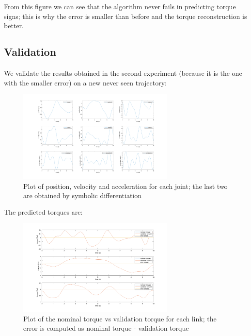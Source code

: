 \documentclass{article}
\begin{document}
From this figure we can see that the algorithm never fails in predicting torque signs; this is why the error is smaller than before and the torque reconstruction is better.

\subsection{Validation} \paragraph{} We validate the results obtained in the second experiment (because it is the one with the smaller error) on a new never seen trajectory:

\begin{figure}[!htbp]
\centering
\includegraphics[width=0.7\textwidth]{images/3-dof/validation_trajectory.png}
\caption{Plot of position, velocity and acceleration for each joint; the last two are obtained by symbolic differentiation}
\end{figure}
\FloatBarrier

The predicted torques are:

\begin{figure}[!htbp]
\centering
\includegraphics[width=0.7\textwidth]{images/3-dof/validation.png}
\caption{Plot of the nominal torque vs validation torque for each link; the error is computed as nominal torque - validation torque}
\end{figure}
\FloatBarrier
\end{document}
